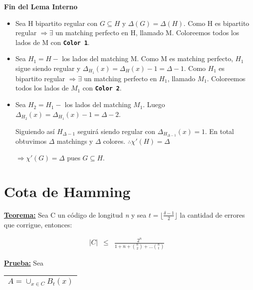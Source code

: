 \documentclass[12pt,a4paper]{report}
\begin{document}
		\textbf{Fin del Lema Interno}
		
		\vspace{5mm}
		\begin{itemize}
			\item Sea H bipartito regular con $G \subseteq H$ y $\Delta(G) = \Delta(H)$. Como H es bipartito regular $\Rightarrow \exists$ un matching perfecto en H, llamado M. Coloreemos todos los lados de M con \textbf{\texttt{Color 1}}.

			\item Sea $H_{1} = H - $ los lados del matching M. Como M es matching perfecto, $H_{1}$ sigue siendo regular y $\Delta_{H_{1}}(x) = \Delta_{H}(x) - 1 = \Delta - 1$. Como $H_{1}$ es bipartito regular $\Rightarrow \exists$ un matching perfecto en $H_{1}$, llamado $M_{1}$. Coloreemos todos los lados de $M_{1}$ con \textbf{\texttt{Color 2}}. 
			
			\item Sea $H_{2} = H_{1} - $ los lados del matching $M_{1}$. Luego $\Delta_{H_{2}}(x) = \Delta_{H_{1}}(x) - 1 = \Delta - 2$. 
			
			
			Siguiendo así $H_{\Delta - 1}$ seguirá siendo regular con $ \Delta_{H_{\Delta - 1}}(x) = 1$. En total obtuvimos $ \Delta $ matchings y $ \Delta $ colores. $\therefore \chi '(H) = \Delta$
			
			\begin{center}
				$\Rightarrow \chi ' (G) = \Delta$ pues $G \subseteq H$.
			\end{center}
		\end{itemize}
			
	\section{Cota de Hamming}
		
		\textbf{\underline{Teorema:}} Sea C un código de longitud \textit{n} y sea $ t = \lfloor \frac{\delta - 1}{2} \rfloor$ la cantidad de errores que corrigue, entonces:
		
		\begin{eqnarray}
			\nonumber \lvert C \rvert &\leq & \frac{2^{n}}{1 + n + {n \choose 2} + \dotsc {n \choose t}}
		\end{eqnarray}
		
		\textbf{\underline{Prueba:}} Sea \begin{tabular}{|c|} \hline $ A = \cup_{x \in C} B_{t}(x) $ \\ \hline \end{tabular}
		
\end{document}
